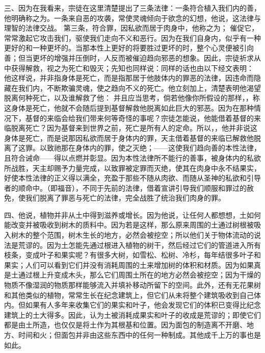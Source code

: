 三、因为在我看来，宗徒在这里清楚提出了三条法律：一条符合植入我们内的善，他明确称之为。一条来自恶的攻袭，常使灵魂倾向于欲念的幻想，他说，这法律与理智的法律交战。 第三条，符合罪，因私欲而居于肉身中，他称之为； 催促它，常常激起它攻击我们，驱使我们走向不义和恶行。因为在我们自身内，似乎有一种更好的和一种更坏的。当那本性上更好的将要胜过更坏的时，整个心灵便被引向善；但当更坏的增强并压倒时，人反而被催迫趋向邪恶的想象。因此，宗徒祈求从中获得解救，视之为死亡和毁灭；先知也同样说：同样的话也由以下经文表明： 他这样说，并非指身体是死亡，而是指那居于他肢体内的罪恶的法律，因违命而隐藏在我们内，不断欺骗灵魂，使之趋向不义的死亡。他立刻加上，清楚表明他渴望脱离何种死亡，以及谁解救了他： 并且应当思考，倘若他像你所假设的那样，，称这身体是死亡，他就不会随后提到基督解救他脱离如此巨大的邪恶。因为在那种情况下，基督的来临会给我们带来何等奇怪的事呢？宗徒怎能说，他能借着基督的来临脱离死亡？因为基督来到世界之前，死亡是所有人的定命。所以，，他并非说这身体是死亡，而是说那因私欲而居于身体内的罪，天主借着基督的来临已解救他脱离了这罪。以致祂那在身体内的罪，使之灭绝；——这使我们趋向善的本性法律，且符合诫命——得以点燃并彰显。因为本性法律所不能行的善事，被身体内的私欲所战胜，天主却赐予力量完成，以致罪被定罪而灭绝，使其在肉身中永不结果实，好使本性法律的正义得以满全，充盈于那些不随从肉欲、而随从圣神的私欲和引导者的顺命中。（即福音），不同于先前的法律，借着宣讲引导我们顺服和罪过的赦免，使我们脱离了罪恶与死亡的法律，完全战胜了统治我们肉身的罪。\par

四、他说，植物并非从土中得到滋养或增长。因为他说，让任何人都想想，土如何能改变并被吸收到树木的质料中。因为若是这样，那么原来周围的土通过树根被吸入树木的整个范围，树木生长的地方，必然会被挖空；所以他们关于物体流动的说法是荒谬的。因为土怎能先通过根进入植物的树干，然后经过它们的管道进入所有枝条，变成叶子和果实呢？有很多大树，如雪松、松树、冷杉，每年结很多叶子和果实；人们可以看到它们并没有消耗周围的土来增加树的体积和材质。因为如果真是土通过根上升变成木头，那么它们周围土所在的地方必然会被挖空；因为干燥的物质不像湿润的物质那样能够流入并填补移动所留下的空间。此外，还有无花果树和其他类似的植物，常常生长在纪念建筑上，但它们从未将整个建筑吸收到自己体内。但如果有人多年来收集它们的果实和叶子，他会发现它们的体积已变得比纪念建筑上的土大得多。因此，认为土被消耗成果实和叶子的收成是荒谬的；即使它们都是由土所造，也仅仅是将土作为其根基和位置。因为面包的制造离不开磨、地方、时间和火；但面包并非由这些东西中的任何一种制成。其他成千上万的事也是如此。\par


